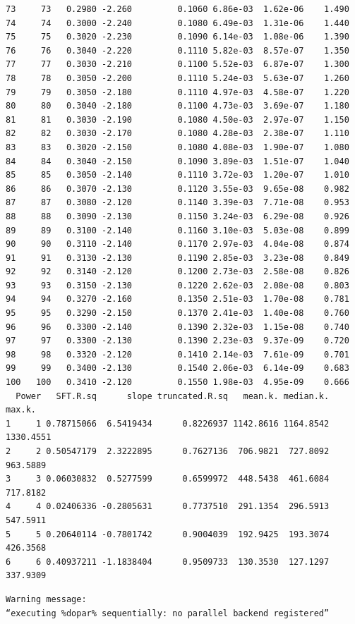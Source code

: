 \documentclass[
  letterpaper,
  DIV=11,
  numbers=noendperiod]{scrartcl}
\begin{document}
\begin{verbatim}
73     73   0.2980 -2.260         0.1060 6.86e-03  1.62e-06    1.490
74     74   0.3000 -2.240         0.1080 6.49e-03  1.31e-06    1.440
75     75   0.3020 -2.230         0.1090 6.14e-03  1.08e-06    1.390
76     76   0.3040 -2.220         0.1110 5.82e-03  8.57e-07    1.350
77     77   0.3030 -2.210         0.1100 5.52e-03  6.87e-07    1.300
78     78   0.3050 -2.200         0.1110 5.24e-03  5.63e-07    1.260
79     79   0.3050 -2.180         0.1110 4.97e-03  4.58e-07    1.220
80     80   0.3040 -2.180         0.1100 4.73e-03  3.69e-07    1.180
81     81   0.3030 -2.190         0.1080 4.50e-03  2.97e-07    1.150
82     82   0.3030 -2.170         0.1080 4.28e-03  2.38e-07    1.110
83     83   0.3020 -2.150         0.1080 4.08e-03  1.90e-07    1.080
84     84   0.3040 -2.150         0.1090 3.89e-03  1.51e-07    1.040
85     85   0.3050 -2.140         0.1110 3.72e-03  1.20e-07    1.010
86     86   0.3070 -2.130         0.1120 3.55e-03  9.65e-08    0.982
87     87   0.3080 -2.120         0.1140 3.39e-03  7.71e-08    0.953
88     88   0.3090 -2.130         0.1150 3.24e-03  6.29e-08    0.926
89     89   0.3100 -2.140         0.1160 3.10e-03  5.03e-08    0.899
90     90   0.3110 -2.140         0.1170 2.97e-03  4.04e-08    0.874
91     91   0.3130 -2.130         0.1190 2.85e-03  3.23e-08    0.849
92     92   0.3140 -2.120         0.1200 2.73e-03  2.58e-08    0.826
93     93   0.3150 -2.130         0.1220 2.62e-03  2.08e-08    0.803
94     94   0.3270 -2.160         0.1350 2.51e-03  1.70e-08    0.781
95     95   0.3290 -2.150         0.1370 2.41e-03  1.40e-08    0.760
96     96   0.3300 -2.140         0.1390 2.32e-03  1.15e-08    0.740
97     97   0.3300 -2.130         0.1390 2.23e-03  9.37e-09    0.720
98     98   0.3320 -2.120         0.1410 2.14e-03  7.61e-09    0.701
99     99   0.3400 -2.130         0.1540 2.06e-03  6.14e-09    0.683
100   100   0.3410 -2.120         0.1550 1.98e-03  4.95e-09    0.666
  Power   SFT.R.sq      slope truncated.R.sq   mean.k. median.k.    max.k.
1     1 0.78715066  6.5419434      0.8226937 1142.8616 1164.8542 1330.4551
2     2 0.50547179  2.3222895      0.7627136  706.9821  727.8092  963.5889
3     3 0.06030832  0.5277599      0.6599972  448.5438  461.6084  717.8182
4     4 0.02406336 -0.2805631      0.7737510  291.1354  296.5913  547.5911
5     5 0.20640114 -0.7801742      0.9004039  192.9425  193.3074  426.3568
6     6 0.40937211 -1.1838404      0.9509733  130.3530  127.1297  337.9309
\end{verbatim}

\begin{verbatim}
Warning message:
“executing %dopar% sequentially: no parallel backend registered”
\end{verbatim}
\end{document}
